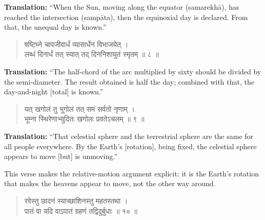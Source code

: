 \documentclass[11pt,a4paper]{article}
\newcommand{\dev}[1]{{\devanagarifont #1}}
\newenvironment{sanskritverse}{\begin{verse}\devanagarifont\large\centering}{\end{verse}}
\begin{document}
\vspace{0.3cm}
\noindent\textbf{Translation:} ``When the Sun, moving along the equator (samarekhā), has reached the intersection (sampāta), then the equinoxial day is declared. From that, the unequal day is known.''

\vspace{0.5cm}

\begin{tcolorbox}[colback=white,colframe=rulecolor,title={\dev{\textbf{गोल ८ — दिनरात्रिमानम् (Length of Day and Night)}}}]
\begin{sanskritverse}
\dev{षष्टिघ्ने चापजीवार्धं व्यासार्धेन विभाजयेत् ।\\
लब्धं दिनार्धं तत् स्यात् तद् दिननिशायुतं स्मृतम् ॥ ८ ॥}
\end{sanskritverse}
\end{tcolorbox}

\vspace{0.3cm}
\noindent\textbf{Translation:} ``The half-chord of the arc multiplied by sixty should be divided by the semi-diameter. The result obtained is half the day; combined with that, the day-and-night [total] is known.''

\vspace{0.5cm}

\begin{tcolorbox}[colback=gray!10,colframe=titlecolor,title={\dev{\textbf{गोल ९ — भूमेर्घूर्णनपरम् (On Earth's Rotation — Continued)}}}]
\begin{sanskritverse}
\dev{यत् खगोलं तु भूगोलं तत् समं सर्वतो नृणाम् ।\\
भूम्ना स्थिरेणाभ्युदितः खगोलः प्रवतेऽचलम् ॥ ९ ॥}
\end{sanskritverse}
\end{tcolorbox}

\vspace{0.3cm}
\noindent\textbf{Translation:} ``That celestial sphere and the terrestrial sphere are the same for all people everywhere. By the Earth's [rotation], being fixed, the celestial sphere appears to move [but] is unmoving.''

\smallskip
\noindent This verse makes the relative-motion argument explicit: it is the Earth's rotation that makes the heavens appear to move, not the other way around.

\vspace{0.5cm}

\begin{tcolorbox}[colback=white,colframe=rulecolor,title={\dev{\textbf{गोल १० — ग्रहणसूत्रम् (Eclipse Conditions)}}}]
\begin{sanskritverse}
\dev{रवेस्तु छादनं स्याच्छाशिनस्तु महतस्तथा ।\\
पातं वा यदि वाऽपातं ग्रहणं तद्विदुर्बुधाः ॥ १० ॥}
\end{sanskritverse}
\end{tcolorbox}
\end{document}
